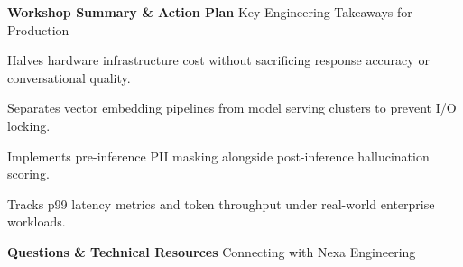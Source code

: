 \documentclass[20pt,landscape,a4paper]{foils}
\newcommand{\SlideHeader}[2]{%
  \begin{tcolorbox}[headerbox]
    {\Huge\bfseries #1} \hfill {\large\textcolor{SlateBorder}{#2}}
  \end{tcolorbox}
  \vspace{6pt}
}
\begin{document}
\SlideHeader{Workshop Summary \& Action Plan}{Key Engineering Takeaways for Production}

\noindent
\begin{minipage}[t]{0.48\textwidth}
  \begin{tcolorbox}[accentbox, title={\textcolor{NavyPrimary}{\large 1. Adopt INT8 Quantization}}]
    \small Halves hardware infrastructure cost without sacrificing response accuracy or conversational quality.
  \end{tcolorbox}
\end{minipage}%
\hfill
\begin{minipage}[t]{0.48\textwidth}
  \begin{tcolorbox}[accentbox, title={\textcolor{NavyPrimary}{\large 2. Decouple Data Ingestion}}]
    \small Separates vector embedding pipelines from model serving clusters to prevent I/O locking.
  \end{tcolorbox}
\end{minipage}

\par\vspace{6pt}

\noindent
\begin{minipage}[t]{0.48\textwidth}
  \begin{tcolorbox}[amberbox, title={\textcolor{NavyPrimary}{\large 3. Enforce Dual-Layer Safety}}]
    \small Implements pre-inference PII masking alongside post-inference hallucination scoring.
  \end{tcolorbox}
\end{minipage}%
\hfill
\begin{minipage}[t]{0.48\textwidth}
  \begin{tcolorbox}[amberbox, title={\textcolor{NavyPrimary}{\large 4. Continuous Profiling}}]
    \small Tracks p99 latency metrics and token throughput under real-world enterprise workloads.
  \end{tcolorbox}
\end{minipage}
\pagebreak

\SlideHeader{Questions \& Technical Resources}{Connecting with Nexa Engineering}
\end{document}
